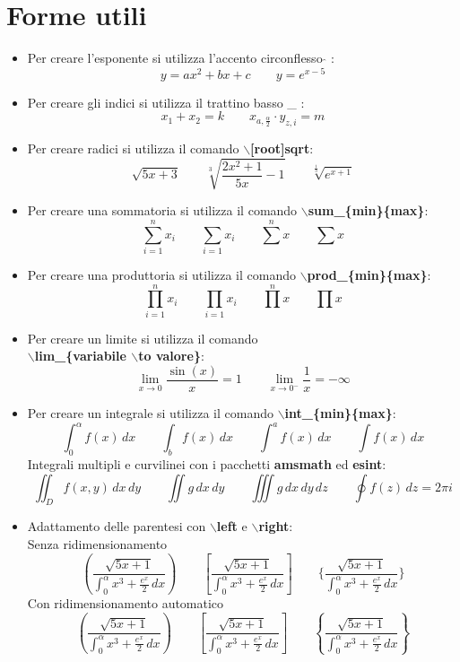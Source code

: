 \documentclass[a4paper,12pt,oneside]{book}
\theoremstyle{plain}
\begin{document}
	\section{Forme utili}
	\begin{itemize}
		\item Per creare l'esponente si utilizza l'accento circonflesso $\hat{}$ :
		\[
		y = ax^2 + bx + c\qquad y = e^{x - 5}
		\]
		
		\item Per creare gli indici si utilizza il trattino basso \_ :
		\[
		x_1 + x_2 = k\qquad x_{a,\frac{\alpha}{2}}\cdot y_{z,i} = m
		\]
		
		\item Per creare radici si utilizza il comando \textbf{$\backslash$[root]sqrt}:
		\[
		\sqrt{5x + 3}\qquad \sqrt[3]{\frac{2x^2+1}{5x}-1} \qquad \sqrt[\frac{1}{3}]{e^{x+1}}
		\]
		
		\item Per creare una sommatoria si utilizza il comando \textbf{$\backslash$sum\_\{min\}$\hat{}$\{max\}}:
		\[
		\sum_{i=1}^{n}x_i\qquad \sum_{i=1}x_i\qquad \sum^{n}x\qquad \sum x
		\]
		
		\item Per creare una produttoria si utilizza il comando \textbf{$\backslash$prod\_\{min\}$\hat{}$\{max\}}:
		\[
		\prod_{i=1}^{n}x_i\qquad \prod_{i=1}x_i\qquad \prod^{n}x\qquad \prod x
		\]
		
		\item Per creare un limite si utilizza il comando\\
		\textbf{$\backslash$lim\_\{variabile $\backslash$to valore\}}:
		\[
		\lim_{x\to 0}\frac{\sin(x)}{x} = 1\qquad \lim_{x\to 0^-}\frac{1}{x} = -\infty
		\]
		
		\item Per creare un integrale si utilizza il comando \textbf{$\backslash$int\_\{min\}$\hat{}$\{max\}}:
		\[
		\int_{0}^{\alpha}f(x)\,dx \qquad \int_{b}f(x)\,dx \qquad \int^{a}f(x)\,dx \qquad \int f(x)\,dx
		\]
		Integrali multipli e curvilinei con i pacchetti \textbf{amsmath} ed \textbf{esint}:
		\[
		\iint_D f(x,y)\,dx\,dy \qquad \iint g\,dx\,dy \qquad
		\iiint g \,dx\,dy\,dz \qquad \oint f(z)\,dz=2\pi i
		\]
		
		\item Adattamento delle parentesi con \textbf{$\backslash$left} e \textbf{$\backslash$right}:\\
		Senza ridimensionamento
		\[
		(\frac{\sqrt{5x+1}}{\int_{0}^{\alpha}x^3+\frac{e^x}{2}\,dx}) \qquad [\frac{\sqrt{5x+1}}{\int_{0}^{\alpha}x^3+\frac{e^x}{2}\,dx}] \qquad \{\frac{\sqrt{5x+1}}{\int_{0}^{\alpha}x^3+\frac{e^x}{2}\,dx}\}
		\]
		Con ridimensionamento automatico
		\[
		\left(\frac{\sqrt{5x+1}}{\int_{0}^{\alpha}x^3+\frac{e^x}{2}\,dx}\right) \qquad \left[\frac{\sqrt{5x+1}}{\int_{0}^{\alpha}x^3+\frac{e^x}{2}\,dx}\right] \qquad \left\{\frac{\sqrt{5x+1}}{\int_{0}^{\alpha}x^3+\frac{e^x}{2}\,dx}\right\}
		\]
		

\end{itemize}
\end{document}
